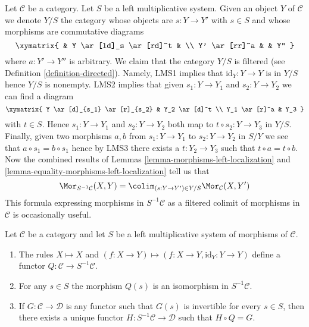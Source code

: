 \begin{remark}
\label{remark-left-localization-morphisms-colimit}
Let $\mathcal{C}$ be a category. Let $S$ be a left multiplicative system.
Given an object $Y$ of $\mathcal{C}$ we denote $Y/S$ the category whose
objects are $s : Y \to Y'$ with $s \in S$ and whose morphisms are
commutative diagrams
$$
\xymatrix{
& Y \ar[ld]_s \ar[rd]^t & \\
Y' \ar[rr]^a & & Y''
}
$$
where $a : Y' \to Y''$ is arbitrary. We claim that the category
$Y/S$ is filtered (see
Definition \ref{definition-directed}).
Namely, LMS1 implies that $\text{id}_Y : Y \to Y$
is in $Y/S$ hence $Y/S$ is nonempty. LMS2 implies that given
$s_1 : Y \to Y_1$ and $s_2 : Y \to Y_2$ we can find a diagram
$$
\xymatrix{
Y \ar[d]_{s_1} \ar[r]_{s_2} & Y_2 \ar[d]^t \\
Y_1 \ar[r]^a & Y_3
}
$$
with $t \in S$. Hence $s_1 : Y \to Y_1$ and $s_2 : Y \to Y_2$
both map to $t \circ s_2 : Y \to Y_3$ in $Y/S$. Finally, given
two morphisms $a, b$ from $s_1 : Y \to Y_1$ to $s_2 : Y \to Y_2$
in $S/Y$ we see that $a \circ s_1 = b \circ s_1$ hence by LMS3
there exists a $t : Y_2 \to Y_3$ such that $t \circ a = t \circ b$.
Now the combined results of
Lemmas \ref{lemma-morphisms-left-localization} and
\ref{lemma-equality-morphisms-left-localization}
tell us that
\begin{equation}
\label{equation-left-localization-morphisms-colimit}
\Mor_{S^{-1}\mathcal{C}}(X, Y) =
\colim_{(s : Y \to Y') \in Y/S} \Mor_\mathcal{C}(X, Y')
\end{equation}
This formula expressing morphisms in $S^{-1}\mathcal{C}$ as a filtered
colimit of morphisms in $\mathcal{C}$ is occasionally useful.
\end{remark}

\begin{lemma}
\label{lemma-properties-left-localization}
Let $\mathcal{C}$ be a category and let $S$ be a left multiplicative
system of morphisms of $\mathcal{C}$.
\begin{enumerate}
\item The rules $X \mapsto X$ and
$(f : X \to Y) \mapsto (f : X \to Y, \text{id}_Y : Y \to Y)$
define a functor $Q : \mathcal{C} \to S^{-1}\mathcal{C}$.
\item For any $s \in S$ the morphism $Q(s)$ is an isomorphism in
$S^{-1}\mathcal{C}$.
\item If $G : \mathcal{C} \to \mathcal{D}$ is any functor such that
$G(s)$ is invertible for every $s \in S$, then there exists a
unique functor $H : S^{-1}\mathcal{C} \to \mathcal{D}$
such that $H \circ Q = G$.
\end{enumerate}
\end{lemma}

